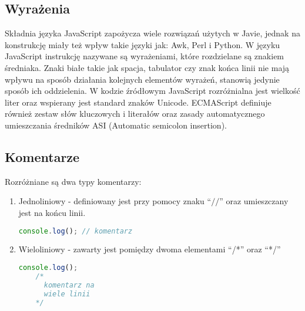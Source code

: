 
\subsection{Wyrażenia}

\par Składnia języka JavaScript zapożycza wiele rozwiązań użytych w Javie, jednak na konstrukcję miały też wpływ takie języki jak: Awk, Perl i Python. W języku JavaScript instrukcję nazywane są wyrażeniami, które rozdzielane są znakiem średniaka. Znaki białe takie jak spacja, tabulator czy znak końca linii nie mają wpływu na sposób działania kolejnych elementów wyrażeń, stanowią jedynie sposób ich oddzielenia. W kodzie źródłowym JavaScript rozróżnialna jest wielkość liter oraz wspierany jest standard znaków Unicode. ECMAScript definiuje również zestaw słów kluczowych i literałów oraz zasady automatycznego umieszczania średników ASI (Automatic semicolon insertion).

\subsection{Komentarze}

\par Rozróżniane są dwa typy komentarzy:
\begin{enumerate}
  \item Jednoliniowy - definiowany jest przy pomocy znaku ``$//$'' oraz umieszczany jest na końcu linii.
  \begin{lstlisting}[language=JavaScript, caption=Przykład komentarza jednoliniowego, label=alg:komentarze1]
    console.log(); // komentarz
  \end{lstlisting}
  \item Wieloliniowy - zawarty jest pomiędzy dwoma elementami ``/*'' oraz ``*/''
  \begin{lstlisting}[language=JavaScript, caption=Przykład komentarza wieloliniowego, label=alg:komentarze2]
    console.log();
    /*
      komentarz na
      wiele linii
    */
  \end{lstlisting}
\end{enumerate}

